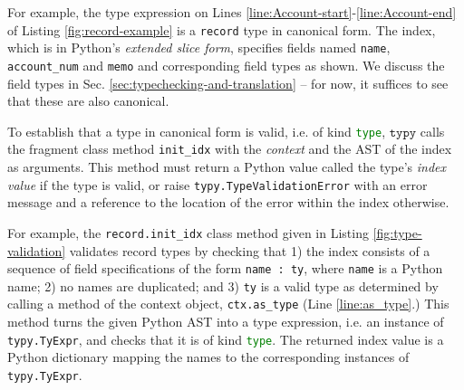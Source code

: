 \documentclass[preprint,10pt]{sigplanconf}
\newcommand{\typy}{\texttt{typy}}
\newcommand{\lip}[1]{\lstinline[language=Python,basicstyle=\ttfamily\footnotesize,deletendkeywords={tuple,buffer,map}]{#1}}
\begin{document}
For example, the type expression on Lines \ref{line:Account-start}-\ref{line:Account-end} of Listing \ref{fig:record-example} is a \lip{record} type in canonical form. The index, which is in Python's \emph{extended slice form}, specifies fields named \lip{name}, \lip{account_num} and \lip{memo} and  corresponding field types as shown. We discuss the field types in Sec. \ref{sec:typechecking-and-translation} -- for now, it suffices to see that these are also canonical.

To establish that a type in canonical form is valid, i.e. of kind \lip{type}, $\typy$ calls the fragment class method \lip{init_idx} with the \emph{context} and the AST of the index as arguments. This method must return a Python value called the type's \emph{index value} if the type is valid, or raise \lip{typy.TypeValidationError} with an error message and a reference to the location of the error within the index otherwise. %

For example, the \lip{record.init_idx} class method given in Listing \ref{fig:type-validation} validates record types by checking that 1) the index consists of a  sequence of field specifications of the form \lip{name : ty}, where \lip{name} is a Python name; 2) no names are duplicated; and 3) \lip{ty} is a valid type as determined by calling a method of the context object, \lip{ctx.as_type} (Line \ref{line:as_type}.) This method turns the given Python AST into a type expression, i.e. an instance of \lip{typy.TyExpr}, and checks that it is of kind \lip{type}. The returned index value is a Python dictionary mapping the names to the corresponding instances of \lip{typy.TyExpr}.



\vspace{-4px}
\end{document}
